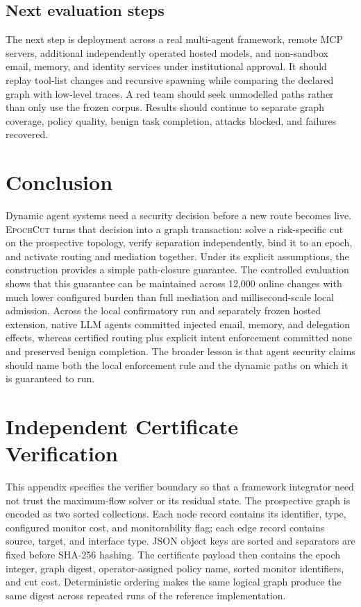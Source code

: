 \documentclass[10pt,journal,compsoc]{IEEEtran}
\newcommand{\system}{\textsc{EpochCut}}
\begin{document}
\subsection{Next evaluation steps}

The next step is deployment across a real multi-agent framework, remote MCP
servers, additional independently operated hosted models, and non-sandbox
email, memory, and identity services under institutional approval.  It should replay tool-list changes and
recursive spawning while comparing the declared graph with low-level traces.
A red team should seek unmodelled paths rather than only use the frozen corpus.
Results should continue to separate graph coverage, policy quality, benign task
completion, attacks blocked, and failures recovered.

\section{Conclusion}

Dynamic agent systems need a security decision before a new route becomes
live.  \system{} turns that decision into a graph transaction: solve a
risk-specific cut on the prospective topology, verify separation independently,
bind it to an epoch, and activate routing and mediation together.  Under its
explicit assumptions, the construction provides a simple path-closure
guarantee.  The controlled evaluation shows that this guarantee can be
maintained across 12,000 online changes with much lower configured burden than
full mediation and millisecond-scale local admission.  Across the local
confirmatory run and separately frozen hosted extension, native LLM agents
committed injected email, memory, and delegation effects, whereas certified
routing plus explicit intent enforcement committed none and preserved benign
completion.  The broader lesson is that agent security claims should name both
the local enforcement rule and the dynamic paths on which it is guaranteed to
run.

\appendices
\section{Independent Certificate Verification}

This appendix specifies the verifier boundary so that a framework integrator
need not trust the maximum-flow solver or its residual state.  The prospective
graph is encoded as two sorted collections.  Each node record contains its
identifier, type, configured monitor cost, and monitorability flag; each edge
record contains source, target, and interface type.  JSON object keys are
sorted and separators are fixed before SHA-256 hashing.  The certificate
payload then contains the epoch integer, graph digest, operator-assigned policy
name, sorted monitor identifiers, and cut cost.  Deterministic ordering makes
the same logical graph produce the same digest across repeated runs of the
reference implementation.
\end{document}
